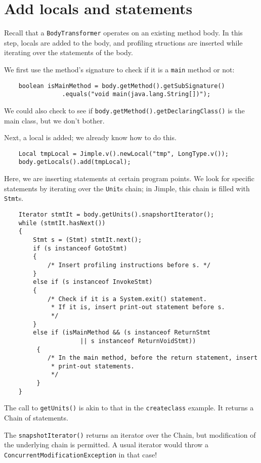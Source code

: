\documentclass{article}
\begin{document}
\section{Add locals and statements}

Recall that a {\tt BodyTransformer} operates on an existing method
body.  In this step, locals are added to the body, and profiling structions
are inserted while iterating over the statements of the body. 

We first use the method's signature to check if it is a {\tt main}
method or not:
\begin{verbatim}
    boolean isMainMethod = body.getMethod().getSubSignature()
                .equals("void main(java.lang.String[])");
\end{verbatim}
We could also check to see if {\tt body.getMethod().getDeclaringClass()}
is the main class, but we don't bother.

Next, a local is added; we already know how to do this.
\begin{verbatim}
    Local tmpLocal = Jimple.v().newLocal("tmp", LongType.v());
    body.getLocals().add(tmpLocal);
\end{verbatim}

Here, we are inserting statements at certain program
points.  We look for specific statements by iterating over the
{\tt Unit}s chain; in Jimple, this chain is filled with {\tt Stmt}s.

\begin{verbatim}
    Iterator stmtIt = body.getUnits().snapshortIterator();
    while (stmtIt.hasNext())
    {
        Stmt s = (Stmt) stmtIt.next();
        if (s instanceof GotoStmt)
        {
            /* Insert profiling instructions before s. */
        }
        else if (s instanceof InvokeStmt)
        {
            /* Check if it is a System.exit() statement.
             * If it is, insert print-out statement before s.
             */
        }
        else if (isMainMethod && (s instanceof ReturnStmt 
                     || s instanceof ReturnVoidStmt))
         {
            /* In the main method, before the return statement, insert
             * print-out statements.
             */
         }
    }
\end{verbatim}

The call to {\tt getUnits()} is akin to that in the {\tt createclass}
example. It returns a Chain of statements. 

The {\tt snapshotIterator()} returns an iterator over the Chain,
but modification of the underlying chain is permitted.  A usual iterator
would throw a {\tt ConcurrentModificationException} in that case!
\end{document}

